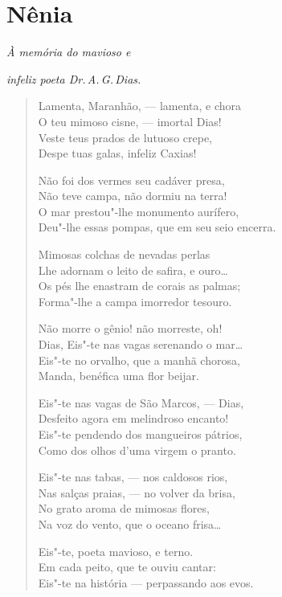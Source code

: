 \chapter{Nênia}

\hfill{}\emph{À memória do mavioso e}

\hfill{}\emph{infeliz poeta Dr.\,A.\,G.\,Dias.}

\medskip

\begin{verse}
Lamenta, Maranhão, --- lamenta, e chora\\
O teu mimoso cisne, --- imortal Dias!\\
Veste teus prados de lutuoso crepe,\\
Despe tuas galas, infeliz Caxias!

Não foi dos vermes seu cadáver presa,\\
Não teve campa, não dormiu na terra!\\
O mar prestou"-lhe monumento aurífero,\\
Deu"-lhe essas pompas, que em seu seio encerra.

Mimosas colchas de nevadas perlas\\
Lhe adornam o leito de safira, e ouro\ldots{}\\
Os pés lhe enastram de corais as palmas;\\
Forma"-lhe a campa imorredor tesouro.

Não morre o gênio! não morreste, oh!\\
Dias, Eis"-te nas vagas serenando o mar\ldots{}\\
Eis"-te no orvalho, que a manhã chorosa,\\
Manda, benéfica uma flor beijar.

Eis"-te nas vagas de São Marcos, --- Dias,\\
Desfeito agora em melindroso encanto!\\
Eis"-te pendendo dos mangueiros pátrios,\\
Como dos olhos d'uma virgem o pranto.

Eis"-te nas tabas, --- nos caldosos rios,\\
Nas salças praias, --- no volver da brisa,\\
No grato aroma de mimosas flores,\\
Na voz do vento, que o oceano frisa\ldots{}

Eis"-te, poeta mavioso, e terno.\\
Em cada peito, que te ouviu cantar:\\
Eis"-te na história --- perpassando aos evos.


\end{verse}
